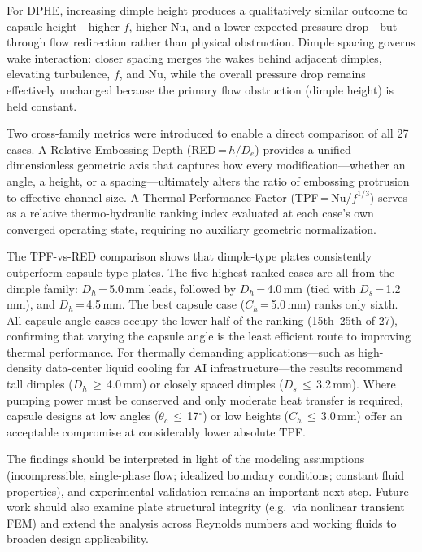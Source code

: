 \documentclass[review,12pt]{elsarticle}
\newcommand{\degree}{\ensuremath{^\circ}}
\begin{document}
For DPHE, increasing dimple height produces a qualitatively similar outcome to capsule height---higher $f$, higher Nu, and a lower expected pressure drop---but through flow redirection rather than physical obstruction. Dimple spacing governs wake interaction: closer spacing merges the wakes behind adjacent dimples, elevating turbulence, $f$, and Nu, while the overall pressure drop remains effectively unchanged because the primary flow obstruction (dimple height) is held constant.

Two cross-family metrics were introduced to enable a direct comparison of all 27 cases. A Relative Embossing Depth (RED\,=\,$h/D_e$) provides a unified dimensionless geometric axis that captures how every modification---whether an angle, a height, or a spacing---ultimately alters the ratio of embossing protrusion to effective channel size. A Thermal Performance Factor (TPF\,=\,Nu/$f^{1/3}$) serves as a relative thermo-hydraulic ranking index evaluated at each case's own converged operating state, requiring no auxiliary geometric normalization.

The TPF-vs-RED comparison shows that dimple-type plates consistently outperform capsule-type plates. The five highest-ranked cases are all from the dimple family: $D_h$\,=\,5.0\,mm leads, followed by $D_h$\,=\,4.0\,mm (tied with $D_s$\,=\,1.2\,mm), and $D_h$\,=\,4.5\,mm. The best capsule case ($C_h$\,=\,5.0\,mm) ranks only sixth. All capsule-angle cases occupy the lower half of the ranking (15th--25th of 27), confirming that varying the capsule angle is the least efficient route to improving thermal performance. For thermally demanding applications---such as high-density data-center liquid cooling for AI infrastructure---the results recommend tall dimples ($D_h$\,$\geq$\,4.0\,mm) or closely spaced dimples ($D_s$\,$\leq$\,3.2\,mm). Where pumping power must be conserved and only moderate heat transfer is required, capsule designs at low angles ($\theta_c$\,$\leq$\,17\degree) or low heights ($C_h$\,$\leq$\,3.0\,mm) offer an acceptable compromise at considerably lower absolute TPF.

The findings should be interpreted in light of the modeling assumptions (incompressible, single-phase flow; idealized boundary conditions; constant fluid properties), and experimental validation remains an important next step. Future work should also examine plate structural integrity (e.g.\ via nonlinear transient FEM) and extend the analysis across Reynolds numbers and working fluids to broaden design applicability.
\end{document}
